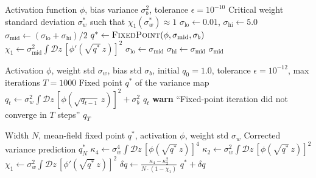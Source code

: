 \documentclass[10pt]{article}
\begin{document}
\begin{algorithm}[t]
\caption{Edge-of-Chaos $\sigma_w^*$ Computation via Bisection}
\label{alg:eoc}
\begin{algorithmic}[1]
\Require Activation function $\phi$, bias variance $\sigma_b^2$, tolerance $\epsilon = 10^{-10}$
\Ensure Critical weight standard deviation $\sigma_w^*$ such that $\chi_1(\sigma_w^*) \approx 1$
\State $\sigma_{\text{lo}} \gets 0.01$, $\sigma_{\text{hi}} \gets 5.0$
    \State $\sigma_{\text{mid}} \gets (\sigma_{\text{lo}} + \sigma_{\text{hi}}) / 2$
    \State $q^* \gets \textsc{FixedPoint}(\phi, \sigma_{\text{mid}}, \sigma_b)$ 
    \State $\chi_1 \gets \sigma_{\text{mid}}^2 \int \mathcal{D}z\, [\phi'(\sqrt{q^*}\, z)]^2$ 
        \State $\sigma_{\text{lo}} \gets \sigma_{\text{mid}}$
    \Else
        \State $\sigma_{\text{hi}} \gets \sigma_{\text{mid}}$
    \EndIf
\EndWhile
\State \Return $\sigma_{\text{mid}}$
\end{algorithmic}
\end{algorithm}

\begin{algorithm}[t]
\caption{Variance Map Fixed-Point Iteration}
\label{alg:fixed-point}
\begin{algorithmic}[1]
\Require Activation $\phi$, weight std $\sigma_w$, bias std $\sigma_b$, initial $q_0 = 1.0$, tolerance $\epsilon = 10^{-12}$, max iterations $T = 1000$
\Ensure Fixed point $q^*$ of the variance map
    \State $q_t \gets \sigma_w^2 \int \mathcal{D}z\, [\phi(\sqrt{q_{t-1}}\, z)]^2 + \sigma_b^2$
        \State \Return $q_t$
    \EndIf
\EndFor
\State \textbf{warn} ``Fixed-point iteration did not converge in $T$ steps''
\State \Return $q_T$
\end{algorithmic}
\end{algorithm}

\begin{algorithm}[t]
\caption{Finite-Width Variance Correction}
\label{alg:finite-width}
\begin{algorithmic}[1]
\Require Width $N$, mean-field fixed point $q^*$, activation $\phi$, weight std $\sigma_w$
\Ensure Corrected variance prediction $q^*_N$
\State $\kappa_4 \gets \sigma_w^4 \int \mathcal{D}z\, [\phi(\sqrt{q^*}\, z)]^4$ 
\State $\kappa_2 \gets \sigma_w^2 \int \mathcal{D}z\, [\phi(\sqrt{q^*}\, z)]^2$ 
\State $\chi_1 \gets \sigma_w^2 \int \mathcal{D}z\, [\phi'(\sqrt{q^*}\, z)]^2$
\State $\delta q \gets \frac{\kappa_4 - \kappa_2^2}{N \cdot (1 - \chi_1)}$ 
\State \Return $q^* + \delta q$
\end{algorithmic}
\end{algorithm}
\end{document}
